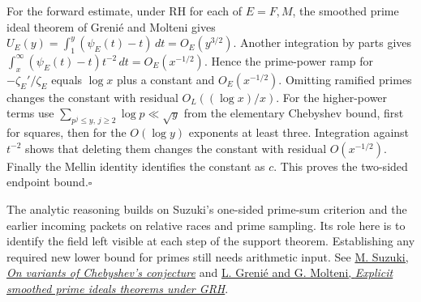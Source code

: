 For the forward estimate, under RH for each of $E=F,M$, the smoothed prime ideal theorem of Greni\'e and Molteni gives
$U_E(y)=\int_1^y(\psi_E(t)-t)\,dt=O_E(y^{3/2})$.
Another integration by parts gives $\int_x^\infty (\psi_E(t)-t)t^{-2}\,dt=O_E(x^{-1/2})$. Hence the prime-power ramp for $-\zeta_E'/\zeta_E$ equals $\log x$ plus a constant and $O_E(x^{-1/2})$. Omitting ramified primes changes the constant with residual $O_L((\log x)/x)$. For the higher-power terms use $\sum_{p^j\le y,\,j\ge2}\log p\ll\sqrt y$ from the elementary Chebyshev bound, first for squares, then for the $O(\log y)$ exponents at least three. Integration against $t^{-2}$ shows that deleting them changes the constant with residual $O(x^{-1/2})$. Finally the Mellin identity identifies the constant as $c$. This proves the two-sided endpoint bound.\hfill$\square$

The analytic reasoning builds on Suzuki's one-sided prime-sum criterion and the earlier incoming packets on relative races and prime sampling. Its role here is to identify the field left visible at each step of the support theorem. Establishing any required new lower bound for primes still needs arithmetic input. See \href{https://arxiv.org/abs/2411.07436}{M. Suzuki, \emph{On variants of Chebyshev's conjecture}} and \href{https://doi.org/10.1090/mcom3039}{L. Greni\'e and G. Molteni, \emph{Explicit smoothed prime ideals theorems under GRH}}.
